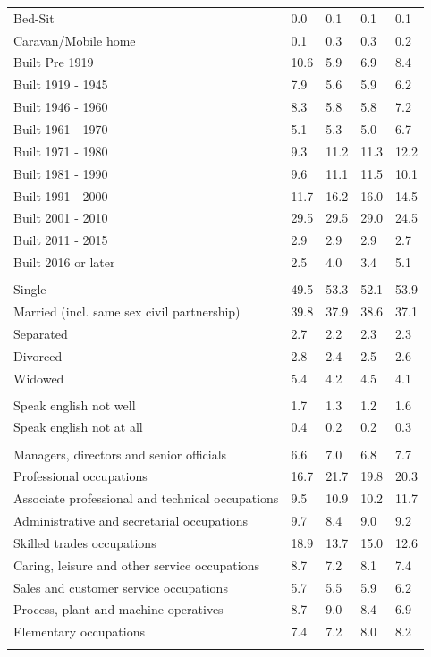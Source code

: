 \documentclass{article}
\begin{document}
\begin{table}[h]
\begin{tabular}{KTTTT}
Bed-Sit & 0.0& 0.1& 0.1& 0.1\\
Caravan/Mobile home & 0.1& 0.3& 0.3& 0.2\\
    \hline
Built Pre 1919 & 10.6&  5.9&  6.9&  8.4\\
Built 1919 - 1945 & 7.9& 5.6& 5.9& 6.2\\
Built  1946 - 1960 & 8.3& 5.8& 5.8& 7.2\\
Built  1961 - 1970 & 5.1& 5.3& 5.0& 6.7\\
Built  1971 - 1980 &  9.3& 11.2& 11.3& 12.2\\
Built  1981 - 1990 &  9.6& 11.1& 11.5& 10.1\\
Built  1991 - 2000 & 11.7& 16.2& 16.0& 14.5\\
Built  2001 - 2010 & 29.5& 29.5& 29.0& 24.5\\
Built  2011 - 2015 & 2.9& 2.9& 2.9& 2.7\\
Built  2016 or later & 2.5& 4.0& 3.4& 5.1\\
\hline
    \\
    \hline
Single & 49.5& 53.3& 52.1& 53.9\\
Married (incl. same sex civil partnership) & 39.8& 37.9& 38.6& 37.1\\
Separated  & 2.7& 2.2& 2.3& 2.3\\
Divorced  & 2.8& 2.4& 2.5& 2.6\\
Widowed & 5.4& 4.2& 4.5& 4.1\\
\hline
    \\ 
    \hline
Speak english not well & 1.7& 1.3& 1.2& 1.6\\
Speak english not at all & 0.4& 0.2& 0.2& 0.3\\
\hline
    \\
    \hline
Managers, directors and senior officials & 6.6& 7.0& 6.8& 7.7\\
Professional occupations & 16.7& 21.7& 19.8& 20.3\\
Associate professional and technical occupations &  9.5& 10.9& 10.2& 11.7\\
Administrative and secretarial occupations & 9.7& 8.4& 9.0& 9.2\\
Skilled trades occupations & 18.9& 13.7& 15.0& 12.6\\
Caring, leisure and other service occupations & 8.7& 7.2& 8.1& 7.4\\
Sales and customer service occupations & 5.7& 5.5& 5.9& 6.2\\
Process, plant and machine operatives & 8.7& 9.0& 8.4& 6.9\\
Elementary occupations & 7.4& 7.2& 8.0& 8.2\\
\hline
\end{tabular}
\end{table}
\end{document}
